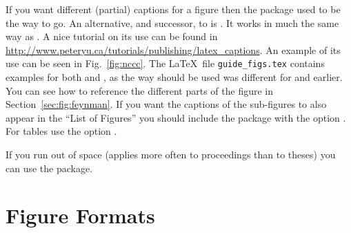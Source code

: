 If you want different (partial) captions for a figure then the
 package used to be the way to go. 
An alternative, and successor, to  is
. It works in much the same way as
. A nice tutorial on its use can be found in
\url{http://www.peteryu.ca/tutorials/publishing/latex_captions}.
An example of its use can be seen in Fig.~\ref{fig:nccc}.
The \LaTeX\ file \texttt{guide\_figs.tex} contains examples for both  and 
, as the way  should be used was
different for  and earlier.
You can see how to reference
the different parts of the figure in Section~\ref{sec:fig:feynman}. If
you want the captions of the sub-figures to also appear in the
\enquote{List of Figures} you should include the package with the
option . For tables use the option .



If you run out of space (applies more often to proceedings than to
theses) you can use the  package.


\section{Figure Formats}
\label{sec:fig:formats}

